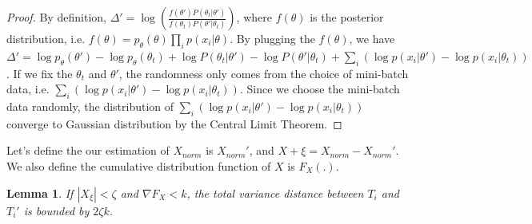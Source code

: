 \documentclass{article}
\newtheorem{lemma}{Lemma}
\begin{document}
\begin{proof}
By definition, $\Delta' = \log \left( \frac{f(\theta')P(\theta_t | \theta')}{f(\theta_t) P(\theta' |
\theta_t)} \right)$, where $f(\theta)$ is the posterior distribution, i.e. $f(\theta) =
p_{\theta}(\theta) \prod_i p(x_i | \theta)$. By plugging the $f(\theta)$, we have $\Delta' = \log
p_{\theta}(\theta') - \log p_{\theta}(\theta_t) + \log P(\theta_t|\theta') - \log
P(\theta'|\theta_t) + \sum_i (\log p(x_i|\theta') - \log p(x_i|\theta_t))$. If we fix the $\theta_t$
and $\theta'$, the randomness only comes from the choice of mini-batch data, i.e. $\sum_i (\log
p(x_i|\theta') - \log p(x_i|\theta_t))$. Since we choose the mini-batch data randomly, the
distribution of $\sum_i (\log p(x_i|\theta') - \log p(x_i|\theta_t))$ converge to Gaussian
distribution by the Central Limit Theorem.
\end{proof}

Let's define the our estimation of $X_{norm}$ is $X_{norm}'$, and $X+{\xi} = X_{norm} - X_{norm}'$.
We also define the cumulative distribution function of $X$ is $F_X(.)$.

\begin{lemma}
If $|X_\xi| < \zeta$ and $\nabla F_X < k$, the total variance distance between $T_i$ and $T_i'$ is
bounded by $2\zeta k$.
\end{lemma}
\end{document}
